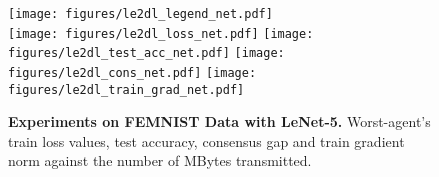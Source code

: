 \documentclass[10pt]{article} %
\theoremstyle{plain}
\theoremstyle{definition}
\theoremstyle{remark}
\begin{document}

\begin{figure*}
    \centering 
    \texttt{[image: figures/le2dl\_legend\_net.pdf]}\\
    \texttt{[image: figures/le2dl\_loss\_net.pdf]}
    \texttt{[image: figures/le2dl\_test\_acc\_net.pdf]}
    \texttt{[image: figures/le2dl\_cons\_net.pdf]}
    \texttt{[image: figures/le2dl\_train\_grad\_net.pdf]}
    \caption{\textbf{Experiments on FEMNIST Data with LeNet-5.} Worst-agent's train loss values, test accuracy, consensus gap and train gradient norm against the number of MBytes transmitted.} \label{fig:femnist_main}
\end{figure*}
\end{document}
